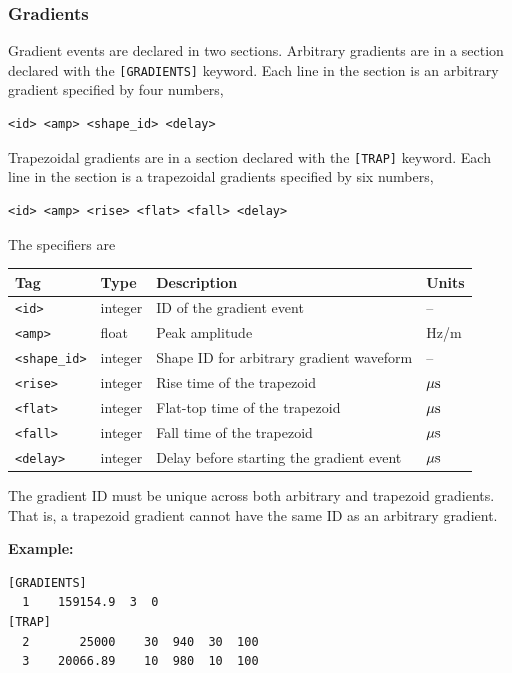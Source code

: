 \documentclass{article}
\begin{document}
\subsubsection{Gradients}
Gradient events are declared in two sections. Arbitrary gradients are in a section declared with the \verb.[GRADIENTS]. keyword. Each line in the section is an arbitrary gradient specified by four numbers,
\begin{lstlisting}
<id> <amp> <shape_id> <delay>
\end{lstlisting}
Trapezoidal gradients are in a section declared with the \verb.[TRAP]. keyword. Each line in the section is a trapezoidal gradients specified by six numbers,
\begin{lstlisting}
<id> <amp> <rise> <flat> <fall> <delay>
\end{lstlisting}

The specifiers are

\begin{tabularx}{\textwidth}{llXl}
\toprule
Tag & Type & Description & Units\\
\midrule
\verb.<id>. & integer & ID of the gradient event & -- \\
\verb.<amp>. & float & Peak amplitude & Hz/m \\
\verb.<shape_id>. & integer & Shape ID for arbitrary gradient waveform & -- \\
\verb.<rise>. & integer & Rise time of the trapezoid & $\rm \mu s$ \\
\verb.<flat>. & integer & Flat-top time of the trapezoid & $\rm \mu s$ \\
\verb.<fall>. & integer & Fall time of the trapezoid & $\rm \mu s$ \\
\verb.<delay>. & integer & Delay before starting the gradient event & $\rm \mu s$\\
\bottomrule
\end{tabularx}

The gradient ID must be unique across both arbitrary and trapezoid gradients. That is, a trapezoid gradient cannot have the same ID as an arbitrary gradient.


\begin{minipage}{\textwidth}
\textbf{Example:}
\begin{lstlisting}
[GRADIENTS]
  1    159154.9  3  0
[TRAP]
  2       25000    30  940  30  100
  3    20066.89    10  980  10  100
\end{lstlisting}
\end{minipage}
\end{document}

